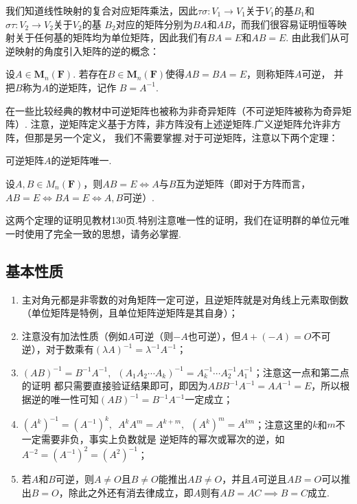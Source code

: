 我们知道线性映射的复合对应矩阵乘法，因此$\tau\sigma:V_1\to V_1$关于$V_1$的基$B_1$和$\sigma\tau:V_2\to V_2$关于$V_2$的基
$B_2$对应的矩阵分别为$BA$和$AB$，而我们很容易证明恒等映射关于任何基的矩阵均为单位矩阵，因此我们有$BA=E$和$AB=E$.
由此我们从可逆映射的角度引入矩阵的逆的概念：
\begin{definition}
    设$A \in \mathbf{M}_n(\mathbf{F})$. 若存在$B \in \mathbf{M}_n(\mathbf{F})$使得$AB=BA=E$，则称矩阵$A$可逆，
    并把$B$称为$A$的逆矩阵，记作 $ B = A^{-1} $.
\end{definition}
在一些比较经典的教材中可逆矩阵也被称为非奇异矩阵（不可逆矩阵被称为奇异矩阵）.
注意，逆矩阵定义基于方阵，非方阵没有上述逆矩阵.广义逆矩阵允许非方阵，但那是另一个定义，
我们不需要掌握.对于可逆矩阵，注意以下两个定理：
\begin{theorem}
    可逆矩阵$A$的逆矩阵唯一.
\end{theorem}
\begin{theorem}
    设$A,B\in M_n(\mathbf{F})$，则$AB=E \iff A$与$B$互为逆矩阵（即对于方阵而言，$AB=E\iff BA=E\iff A,B\text{可逆}$）.
\end{theorem}
这两个定理的证明见教材130页.特别注意唯一性的证明，我们在证明群的单位元唯一时使用了完全一致的思想，请务必掌握.

\subsection{基本性质}
\begin{enumerate}
    \item 主对角元都是非零数的对角矩阵一定可逆，且逆矩阵就是对角线上元素取倒数（单位矩阵是特例，且单位矩阵逆矩阵是其自身）；

    \item 注意没有加法性质（例如$A$可逆（则$-A$也可逆），但$A+(-A)=O$不可逆），对于数乘有$(\lambda A)^{-1}=\lambda^{-1}A^{-1}$；

    \item $(AB)^{-1}=B^{-1}A^{-1},\enspace (A_1A_2\cdots A_k)^{-1}=A_k^{-1}\cdots A_2^{-1}A_1^{-1}$；注意这一点和第二点的证明
    都只需要直接验证结果即可，即因为$ABB^{-1}A^{-1}=AA^{-1}=E$，所以根据逆的唯一性可知$(AB)^{-1}=B^{-1}A^{-1}$一定成立；

    \item $(A^k)^{-1}=(A^{-1})^k,\enspace A^kA^m=A^{k+m},\enspace (A^k)^m=A^{km}$；注意这里的$k$和$m$不一定需要非负，事实上负数就是
    逆矩阵的幂次或幂次的逆，如$A^{-2}=(A^{-1})^2=(A^2)^{-1}$；

    \item 若$A$和$B$可逆，则$A\neq O$且$B\neq O$能推出$AB\neq O$，并且$A$可逆且$AB=O$可以推出$B=O$，除此之外还有消去律成立，即$A$则有$AB=AC \implies B=C$成立.
\end{enumerate}

